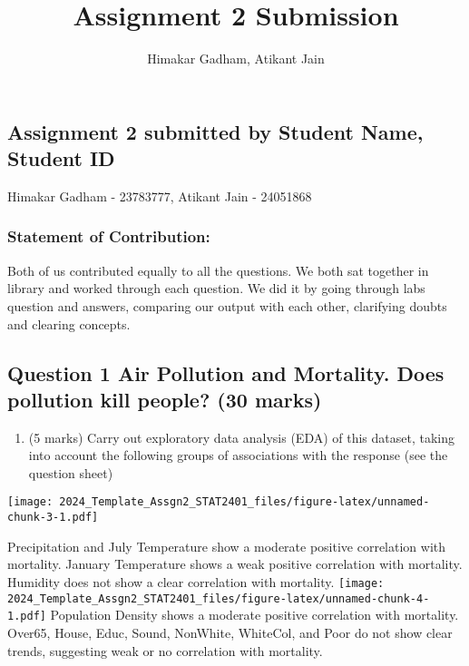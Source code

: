 \documentclass[
]{article}
\title{Assignment 2 Submission}
\author{Himakar Gadham, Atikant Jain}
\date{}
\providecommand{\tightlist}{%
  \setlength{\itemsep}{0pt}\setlength{\parskip}{0pt}}
\begin{document}
\maketitle

\hypertarget{assignment-2-submitted-by-student-name-student-id}{%
\subsection{Assignment 2 submitted by Student Name, Student
ID}\label{assignment-2-submitted-by-student-name-student-id}}

Himakar Gadham - 23783777, Atikant Jain - 24051868

\hypertarget{statement-of-contribution}{%
\subsubsection{Statement of
Contribution:}\label{statement-of-contribution}}

Both of us contributed equally to all the questions. We both sat
together in library and worked through each question. We did it by going
through labs question and answers, comparing our output with each other,
clarifying doubts and clearing concepts.

\hypertarget{question-1-air-pollution-and-mortality.-does-pollution-kill-people-30-marks}{%
\subsection{Question 1 Air Pollution and Mortality. Does pollution kill
people? (30
marks)}\label{question-1-air-pollution-and-mortality.-does-pollution-kill-people-30-marks}}

\begin{enumerate}
\def\labelenumi{(\alph{enumi})}
\tightlist
\item
  (5 marks) Carry out exploratory data analysis (EDA) of this dataset,
  taking into account the following groups of associations with the
  response (see the question sheet)
\end{enumerate}

\texttt{[image: 2024\_Template\_Assgn2\_STAT2401\_files/figure-latex/unnamed-chunk-3-1.pdf]}

Precipitation and July Temperature show a moderate positive correlation
with mortality. January Temperature shows a weak positive correlation
with mortality. Humidity does not show a clear correlation with
mortality.
\texttt{[image: 2024\_Template\_Assgn2\_STAT2401\_files/figure-latex/unnamed-chunk-4-1.pdf]}
Population Density shows a moderate positive correlation with mortality.
Over65, House, Educ, Sound, NonWhite, WhiteCol, and Poor do not show
clear trends, suggesting weak or no correlation with mortality.
\end{document}
